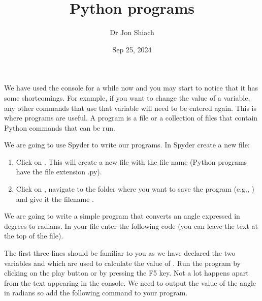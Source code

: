 \documentclass[letterpaper,10pt,english]{jupyterBook}
\title{Python programs}
\date{Sep 25, 2024}
\author{Dr Jon Shiach}
\begin{document}
\pagestyle{empty}
\sphinxmaketitle
\pagestyle{plain}
\sphinxtableofcontents
\pagestyle{normal}
\label{\detokenize{_pages/1.5_Python_programs::doc}}


\sphinxAtStartPar
We have used the console for a while now and you may start to notice that it has some shortcomings. For example, if you want to change the value of a variable, any other commands that use that variable will need to be entered again. This is where programs are useful. A program is a file or a collection of files that contain Python commands that can be run.

\sphinxAtStartPar
We are going to use Spyder to write our programs. In Spyder create a new file:
\begin{enumerate}
%
\item {} 
\sphinxAtStartPar
Click on . This will create a new file with the file name   (Python programs have the file extension .py).

\item {} 
\sphinxAtStartPar
Click on , navigate to the folder where you want to save the program (e.g., ) and give it the filename .

\end{enumerate}

\sphinxAtStartPar
We are going to write a simple program that converts an angle expressed in degrees to radians. In your  file enter the following code (you can leave the text at the top of the file).

\begin{sphinxVerbatim}[commandchars=\\\{\}]
  
  
      
\end{sphinxVerbatim}

\sphinxAtStartPar
The first three lines should be familiar to you as we have declared the two variables  and  which are used to calculate the value of . Run the program by clicking on the play button or by pressing the F5 key. Not a lot happens apart from the text  appearing in the console. We need to output the value of the angle in radians so add the following command to your program.
\end{document}
